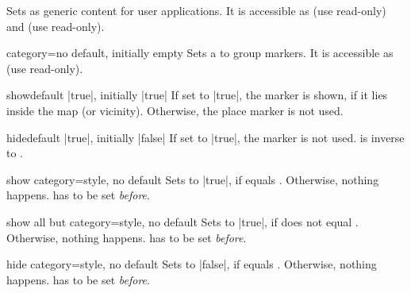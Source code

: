 \begin{docMrcKeys}[
  doc keypath     = marker,
  doc name        = generic,
  doc parameter   = {=\meta{text}},
  doc description = {no default, initially empty},
  doc new         = 2020-05-04,
]{}
  Sets  as generic content for user applications.
  It is accessible as  (use read-only)
  and  (use read-only).
\end{docMrcKeys}


\begin{docMrcKey}[marker]{category}{=}{no default, initially empty}
  Sets a  to group markers.
  It is accessible as  (use read-only).
\end{docMrcKey}

\clearpage

\begin{docMrcKey}[marker]{show}{}{default |true|, initially |true|}
  If set to |true|, the marker is shown, if it lies inside the map (or vicinity).
  Otherwise, the place marker is not used.
\end{docMrcKey}


\begin{docMrcKey}[marker]{hide}{}{default |true|, initially |false|}
  If set to |true|, the marker is not used.
   is inverse to .
\end{docMrcKey}



\begin{docMrcKey}[marker]{show category}{=}{style, no default}
  Sets  to |true|, if  equals .
  Otherwise, nothing happens.
   has to be set \emph{before}.
\end{docMrcKey}


\begin{docMrcKey}[marker]{show all but category}{=}{style, no default}
  Sets  to |true|, if  does not equal .
  Otherwise, nothing happens.
   has to be set \emph{before}.
\end{docMrcKey}


\begin{docMrcKey}[marker]{hide category}{=}{style, no default}
  Sets  to |false|, if  equals .
  Otherwise, nothing happens.
   has to be set \emph{before}.
\end{docMrcKey}


